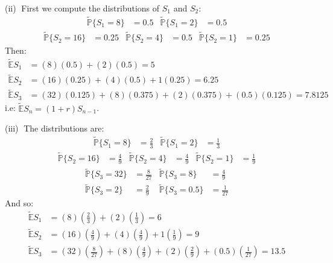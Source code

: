 \documentclass[12pt, letterpaper]{article}
\begin{document}
\rightline{$\square$}

\vspace{5mm}
\noindent
(ii)$\;$ First we compute the distributions of $S_1$ and $S_2$:
\begin{align*}
    \tilde{\mathbb P} \{ S_1 = 8 \} &= 0.5 & \tilde{\mathbb P} \{ S_1 = 2 \} &= 0.5
\end{align*}
\begin{align*}
    \tilde{\mathbb P} \{ S_2 =  16\} &= 0.25 & \tilde{\mathbb P} \{ S_2 = 4 \} &= 0.5
    & \tilde{\mathbb P} \{ S_2 = 1 \} &= 0.25
\end{align*}
Then:
\begin{align*}
    \tilde{\mathbb E} S_1 &= (8)(0.5)+(2)(0.5) = 5 \\
    \tilde{\mathbb E} S_2 &= (16)(0.25)+(4)(0.5) + 1(0.25) = 6.25 \\
    \tilde{\mathbb E} S_3 &= (32)(0.125)+(8)(0.375)+(2)(0.375)+(0.5)(0.125) = 7.8125
\end{align*}
i.e: $\tilde{\mathbb E} S_n = (1+r)S_{n-1}$.

\rightline{$\square$}

\vspace{5mm}
\noindent
(iii)$\;$ The distributions are:
\begin{align*}
    \tilde{\mathbb P} \{ S_1 = 8 \} &= \tfrac 2 3 & \tilde{\mathbb P} \{ S_1 = 2 \} &= \tfrac 1 3
\end{align*}
\begin{align*}
    \tilde{\mathbb P} \{ S_2 =  16\} &= \tfrac 4 9 & \tilde{\mathbb P} \{ S_2 = 4 \} &= \tfrac 4 9
    & \tilde{\mathbb P} \{ S_2 = 1 \} &= \tfrac 1 9
\end{align*}
\begin{align*}
    \tilde{\mathbb P} \{ S_3 = 32 \} &= \tfrac 8 {27}  & \tilde{\mathbb P} \{ S_3 = 8 \} &= \tfrac 4 9  \\
    \tilde{\mathbb P} \{ S_3 = 2 \} &= \tfrac 2 9 & \tilde{\mathbb P} \{ S_3 = 0.5 \} &= \tfrac 1 {27}
\end{align*}
And so:
\begin{align*}
    \tilde{\mathbb E} S_1 &= (8) \left(\tfrac 2 3 \right)+(2)\left(\tfrac 1 3 \right) = 6 \\
    \tilde{\mathbb E} S_2 &= (16)\left(\tfrac 4 9 \right)+(4)\left(\tfrac 4 9 \right) + 1\left(\tfrac 1 9 \right) = 9 \\
    \tilde{\mathbb E} S_3 &= (32)\left(\tfrac 8 {27} \right)+(8)\left(\tfrac 4 9 \right)+(2)\left(\tfrac 2 9 \right)+(0.5)\left(\tfrac 1 {27} \right) = 13.5
\end{align*}
\end{document}
